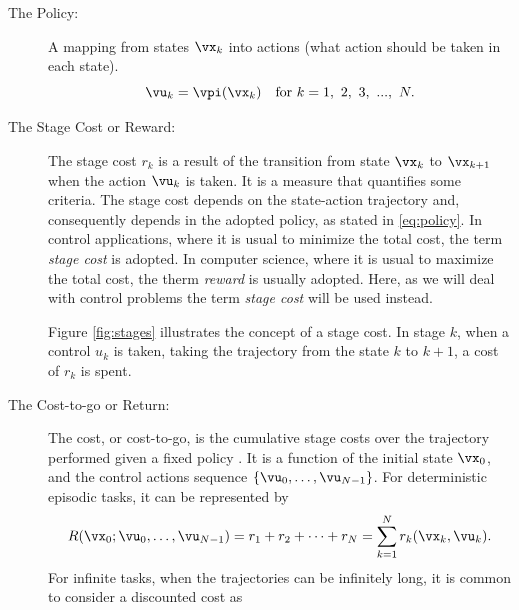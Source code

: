 \begin{description}
    \item[The Policy:] A mapping from states $\vx_k$ into actions (what action should be taken in each state).
      \begin{equation}
          \vu_k = \vpi(\vx_k) \quad \text{for } k=1,\ 2,\ 3,\ ...,\ N
      \label{eq:policy}.
      \end{equation}

    \item[The Stage Cost or Reward:] The stage cost 
      $r_{k}$ is a result of the transition from state $\vx_k$ to $\vx_{k+1}$ when the action  $\vu_k$  is taken.  
      It is a measure that quantifies some criteria. The stage cost depends on the state-action trajectory and, consequently depends in the adopted policy, as stated in \eqref{eq:policy}.
      In control applications, where it is usual to minimize the total cost,  the term \emph{stage cost} is adopted. In computer science, where it is usual to maximize the total cost, the therm  \textit{reward} is usually adopted.
      Here, as we will deal with control problems the term \textit{stage cost} will be used instead.

      Figure \ref{fig:stages} illustrates the concept of a stage cost. In stage $k$, when a control $u_k$ is taken, taking the trajectory from the state $k$ to  $k+1$, a cost of $r_k$ is spent.

    \item[The Cost-to-go or Return:] The cost, or cost-to-go, is the cumulative stage costs over the trajectory performed given a fixed policy 
      . It is a function of the initial state $\vx_0$, and the control actions sequence $\left\{ \vu_0, \dots, \vu_{N-1}\right\}$.
      For deterministic episodic tasks, it can be represented by 
      \begin{equation}
          R(\vx_0;\vu_0, \dots, \vu_{N-1}) = r_1+r_2+\dots+r_N = \sum_{k=1}^N{ r_k(\vx_k, \vu_k) } 
      \label{eq:return}.
      \end{equation}
      For infinite tasks, when the trajectories can be infinitely long, it is common to consider a discounted cost  as


\end{description}
